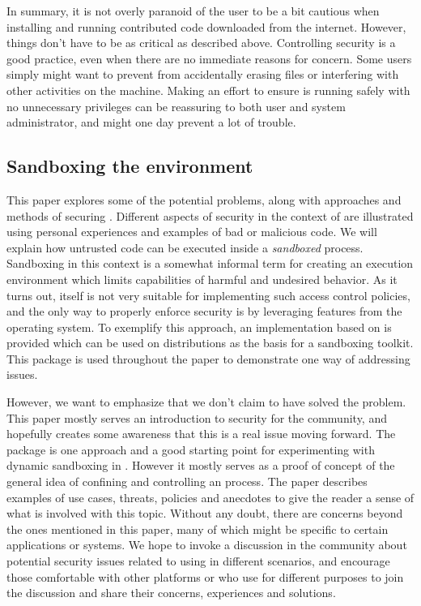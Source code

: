In summary, it is not overly paranoid of the \R user to be a bit cautious when
installing and running contributed code downloaded from the internet. However,
things don't have to be as critical as described above. Controlling security is
a good practice, even when there are no immediate reasons for concern. Some
users simply might want to prevent \R from accidentally erasing files or
interfering with other activities on the machine. Making an effort to ensure \R
is running safely with no unnecessary privileges can be reassuring to both user
and system administrator, and might one day prevent a lot of trouble.

\subsection{Sandboxing the \R environment}


This paper explores some of the potential problems, along with approaches and
methods of securing \R. Different aspects of security in the context of \R are
illustrated using personal experiences and examples of bad or malicious code. We
will explain how untrusted code can be executed inside a \emph{sandboxed}
process. Sandboxing in this context is a somewhat informal term for creating an
execution environment which limits capabilities of harmful and undesired
behavior. As it turns out, \R itself is not very suitable for implementing such
access control policies, and the only way to properly enforce security is by
leveraging features from the operating system. To exemplify this approach, an
implementation based on \AppArmor is provided which can be used on \Linux
distributions as the basis for a sandboxing toolkit. This package is used
throughout the paper to demonstrate one way of addressing issues.

However, we want to emphasize that we don't claim to have solved the problem.
This paper mostly serves an introduction to security for the \R community, and
hopefully creates some awareness that this is a real issue moving forward. The
\RAppArmor package is one approach and a good starting point for experimenting
with dynamic sandboxing in \R. However it mostly serves as a proof of concept of
the general idea of confining and controlling an \R process. The paper describes
examples of use cases, threats, policies and anecdotes to give the reader a
sense of what is involved with this topic. Without any doubt, there are concerns
beyond the ones mentioned in this paper, many of which might be specific to
certain applications or systems. We hope to invoke a discussion in the community about
potential security issues related to using \R in different scenarios, and
encourage those comfortable with other platforms or who use \R for different
purposes to join the discussion and share their concerns, experiences and
solutions.

